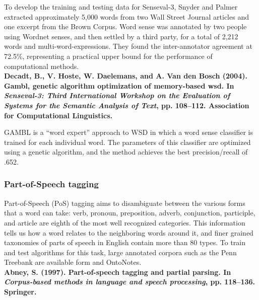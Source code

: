 {\noindent To develop the training and testing data for Senseval-3, Snyder and Palmer
extracted approximately 5,000 words from two Wall Street Journal articles and one excerpt from the Brown Corpus.
Word sense was annotated by two people using Wordnet senses, and then settled by a third party, for a total of 2,212 words and multi-word-expressions.
They found the inter-annotator agreement at 72.5\%, representing a practical upper bound for the performance of computational methods.\\

\noindent \textbf{Decadt, B., V. Hoste, W. Daelemans, and A. Van den Bosch (2004). Gambl, genetic algorithm optimization of memory-based wsd. In \textit{Senseval-3: Third International Workshop on the Evaluation of Systems for the Semantic Analysis of Text}, pp. 108–112. Association for Computational Linguistics.}

\noindent GAMBL is a ``word expert'' approach to WSD in which a word sense classifier is trained for each individual word.
The parameters of this classifier are optimized using a genetic algorithm, and the method achieves the best precision/recall of .652.\\


\subsubsection{Part-of-Speech tagging}

Part-of-Speech (PoS) tagging aims to disambiguate between the various forms that a word can take: verb, pronoun, preposition, adverb, conjunction, participle, and article are eighth of the most well recognized categories.
This information tells us how a word relates to the neighboring words around it, and finer grained taxonomies of parts of speech in English contain more than 80 types.
To train and test algorithms for this task, large annotated corpora such as the Penn Treebank are available form \cite{marcus1993building} and OntoNotes.\\


\noindent \textbf{Abney, S. (1997). Part-of-speech tagging and partial parsing. In \textit{Corpus-based methods in language and speech processing}, pp. 118–136. Springer.}

}
